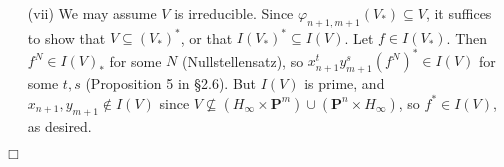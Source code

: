 \documentclass{article}
\begin{document}
\begin{enumerate}
\begin{enumerate}
  \item[(vii)]
    We may assume $V$ is irreducible.
    Since $\varphi_{n+1,m+1}(V_*) \subseteq V$,
    it suffices to show that $V \subseteq (V_{*})^{*}$,
    or that $I(V_{*})^{*} \subseteq I(V)$.
    Let $f \in I(V_{*})$.
    Then $f^N \in I(V)_{*}$ for some $N$ (Nullstellensatz),
    so $x_{n+1}^{t} y_{m+1}^{s} (f^N)^{*} \in I(V)$ for some $t, s$ (Proposition 5 in \S 2.6).
    But $I(V)$ is prime, and $x_{n+1}, y_{m+1} \not\in I(V)$
    since $V \not\subseteq (H_{\infty} \times \mathbf{P}^{m}) \cup (\mathbf{P}^{n} \times H_{\infty})$,
    so $f^{*} \in I(V)$, as desired.
  \end{enumerate}
\end{enumerate}
$\Box$ \\
\end{document}
